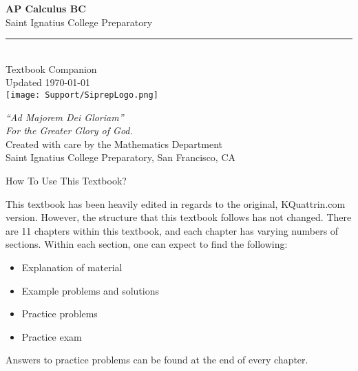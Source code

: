 \documentclass[11pt]{exam}
\begin{document}
\allowdisplaybreaks


\thispagestyle{empty}

\begin{center}
    {\Huge \textbf{AP Calculus BC}}\\[1.5cm]
    
    {\LARGE Saint Ignatius College Preparatory}\\[0.3cm]
    \rule{0.6\linewidth}{0.6pt}\\[0.5cm]
    
    {\Large Textbook Companion}\\[0.5cm]
    
    {\large Updated \fulldate\today}\\[1.5cm]
    
    \texttt{[image: Support/SiprepLogo.png]} 
    
    \vfill

    {\Large \textit{“Ad Majorem Dei Gloriam”}}\\[0.2cm]
    \textit{For the Greater Glory of God.}\\[2cm]

    \small Created with care by the Mathematics Department\\
    Saint Ignatius College Preparatory, San Francisco, CA
\end{center}

\newpage

\begin{center}
    {\LARGE How To Use This Textbook?}
\end{center}

\vspace{44pt}

This textbook has been heavily edited in regards to the original, KQuattrin.com version. However, the structure that this textbook follows has not changed. There are 11 chapters within this textbook, and each chapter has varying numbers of sections. Within each section, one can expect to find the following: \begin{itemize}
    \item Explanation of material
    \item Example problems and solutions
    \item Practice problems
    \item Practice exam
\end{itemize}

Answers to practice problems can be found at the end of every chapter. \par
\end{document}
